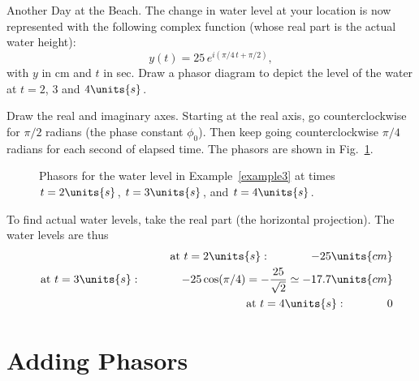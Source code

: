 \begin{example}{Another Day at the Beach.}  
\label{example3}
The change in water level at your location is now represented with
the following complex function (whose real part is the actual water
height):
\begin{equation}
y(t) = 25 \, e^{i(\pi/4\, t + \pi/2)},
\end{equation}
with $y$ in cm and $t$ in sec. 
Draw a phasor diagram to depict the level of the water at $t = 2$, 3 and 
$4\units{s}$.
\begin{solution}
Draw the real and imaginary axes.  Starting at the real axis, 
go counterclockwise for $\pi/2$ radians (the phase constant $\phi_0$).  
Then keep going counterclockwise $\pi/4$ radians for each second of 
elapsed time.  The phasors are shown in Fig.~\ref{fig:phasorRotation}.

\begin{figure}
\begin{center}
\caption{\label{fig:phasorRotation}Phasors for the water level in 
Example~\ref{example3} at times $t=2\units{s}$, $t=3\units{s}$, and 
$t=4\units{s}$.}
\end{center}
\end{figure}
To find actual water levels, take the real part (the horizontal projection).  
The water levels are thus   
\begin{eqnarray}
&&\mbox{at $t=2\units{s}$}: \hspace{0.5in}-25\units{cm}\nonumber \\
&&\mbox{at $t=3\units{s}$}: \hspace{0.5in}-25\cos(\pi/4)= 
  -\frac{25}{\sqrt{2}}\simeq-17.7\units{cm}\nonumber\\ 
&&\mbox{at $t=4\units{s}$}:\hspace{0.5in}0\nonumber
\end{eqnarray}
\end{solution}
\end{example}

\section{Adding Phasors}
\label{sec:adding_phasors}

